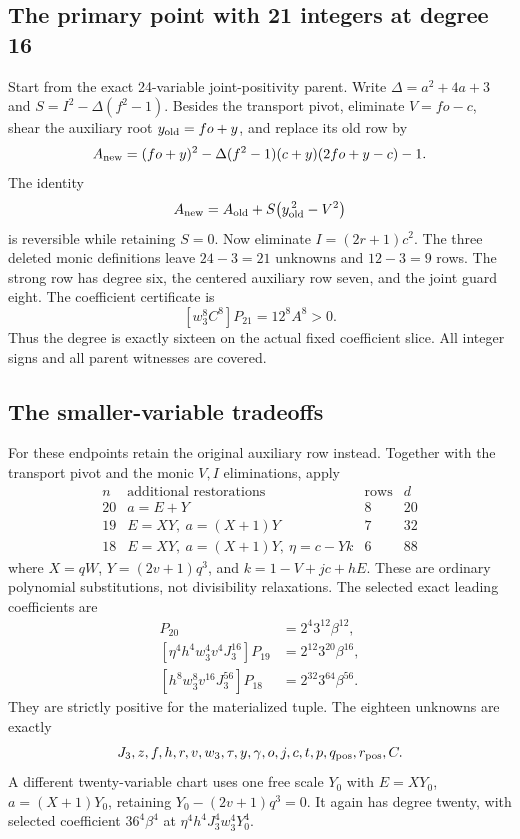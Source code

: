 \documentclass[11pt]{article}
\begin{document}
\subsection{The primary point with 21 integers at degree 16}
Start from the exact 24-variable joint-positivity parent. Write
$\Delta=a^2+4a+3$ and $S=I^2-\Delta(f^2-1)$. Besides the transport
pivot, eliminate $V=fo-c$, shear the auxiliary root
$y_{\rm old}=fo+y$, and replace its old row by
\[
 A_{\rm new}=(fo+y)^2-
 \Delta(f^2-1)(c+y)(2fo+y-c)-1.
\]
The identity
\[
 A_{\rm new}=A_{\rm old}
       +S\bigl(y_{\rm old}^{\,2}-V^2\bigr)
\]
is reversible while retaining $S=0$. Now eliminate
$I=(2r+1)c^2$. The three deleted monic definitions leave
$24-3=21$ unknowns and $12-3=9$ rows. The strong row has degree six,
the centered auxiliary row seven, and the joint guard eight.
The coefficient certificate is
\[
 [w_3^8C^8]P_{21}=12^8A^8>0.
\]
Thus the degree is exactly sixteen on the actual fixed coefficient
slice. All integer signs and all parent witnesses are covered.

\subsection{The smaller-variable tradeoffs}
For these endpoints retain the original auxiliary row instead. Together
with the transport pivot and the monic $V,I$ eliminations, apply
\[
\begin{array}{c|l|c|c}
 n&\text{additional restorations}&\text{rows}&d\\\hline
20&a=E+Y&8&20\\
19&E=XY,\ a=(X+1)Y&7&32\\
18&E=XY,\ a=(X+1)Y,\ \eta=c-Yk&6&88
\end{array}
\]
where $X=qW$, $Y=(2v+1)q^3$, and $k=1-V+jc+hE$.
These are ordinary polynomial substitutions, not divisibility
relaxations. The selected exact leading coefficients are
\begin{align*}
[f^4v^4J_3^{12}]P_{20}&=2^4 3^{12}\beta^{12},\\
[\eta^4h^4w_3^4v^4J_3^{16}]P_{19}&=2^{12}3^{20}\beta^{16},\\
[h^8w_3^8v^{16}J_3^{56}]P_{18}&=2^{32}3^{64}\beta^{56}.
\end{align*}
They are strictly positive for the materialized tuple. The eighteen
unknowns are exactly
\[
 J_3,z,f,h,r,v,w_3,\tau,y,\gamma,o,j,c,t,p,q_{\rm pos},r_{\rm pos},C.
\]
A different twenty-variable chart uses one free scale $Y_0$ with
$E=XY_0$, $a=(X+1)Y_0$, retaining
$Y_0-(2v+1)q^3=0$. It again has degree twenty, with selected coefficient
$36^4\beta^4$ at $\eta^4h^4J_3^4w_3^4Y_0^4$.
\end{document}
